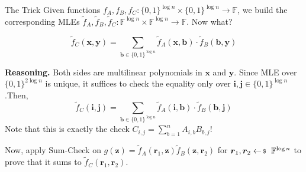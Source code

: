 \documentclass{zkdl-presentation-template}
\begin{document}
    \begin{frame}{The Trick}
        Given functions $f_A,f_B,f_C: \{0,1\}^{\log n} \times \{0,1\}^{\log n}
        \to \mathbb{F}$, we build the corresponding MLEs $\widetilde{f}_A,
        \widetilde{f}_B, \widetilde{f}_C: \mathbb{F}^{\log n} \times
        \mathbb{F}^{\log n} \to \mathbb{F}$. Now what? \pause

        \begin{lemma}
            \begin{equation*}
                \widetilde{f}_C(\mathbf{x}, \mathbf{y}) = \sum_{\boldsymbol{b} \in
            \{0,1\}^{\log
            n}}\widetilde{f}_A(\mathbf{x},\boldsymbol{b})\cdot\widetilde{f}_B(\boldsymbol{b},\mathbf{y})
            \end{equation*}
        \end{lemma}

        \pause\textcolor{oc-gray-7}{\textbf{Reasoning.} Both sides are multilinear polynomials in
        $\mathbf{x}$ and $\mathbf{y}$. Since MLE over $\{0,1\}^{2\log n}$ is
        unique, it suffices to check the equality only over
        $\boldsymbol{i},\boldsymbol{j} \in \{0,1\}^{\log n}$.\pause Then,
        \begin{equation*}
            \widetilde{f}_C(\boldsymbol{i}, \boldsymbol{j}) = \sum_{\boldsymbol{b} \in
            \{0,1\}^{\log
            n}}\widetilde{f}_A(\boldsymbol{i},\boldsymbol{b})\cdot\widetilde{f}_B(\boldsymbol{b},\boldsymbol{j})
        \end{equation*}
        \pause Note that this is exactly the check $C_{i,j} = \sum_{b=1}^n A_{i,b}B_{b,j}$!}

        \pause Now, apply Sum-Check on $g(\mathbf{z}) =
        \widetilde{f}_A(\boldsymbol{r}_1,\mathbf{z})\widetilde{f}_B(\mathbf{z},\boldsymbol{r}_2)$
        for $\boldsymbol{r}_1,\boldsymbol{r}_2 \leftarrowS \mathbb{F}^{\log n}$
        to prove that it sums to $\widetilde{f}_C(\boldsymbol{r}_1,\boldsymbol{r}_2)$.
    \end{frame}
\end{document}
